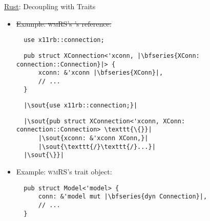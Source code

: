 \begin{frame}[fragile]{\underline{Rust}: Decoupling with Traits \hfill {\footnotesize \currentname}}


    \begin{itemize}

        \item \sout<2>{Example: \textsc{wmRS}'s 's  reference:}\\[3pt]
\begin{overprint}
\begin{verbatim}
  use x11rb::connection;
\end{verbatim}
\begin{verbatim}
  pub struct XConnection<'xconn, |\bfseries{XConn: connection::Connection}|> {
      xconn: &'xconn |\bfseries{XConn}|,
      // ...
  }
\end{verbatim}
\begin{verbatim}
  |\sout{use x11rb::connection;}|
\end{verbatim}
\begin{verbatim}
  |\sout{pub struct XConnection<'xconn, XConn: connection::Connection> \texttt{\{}}|
      |\sout{xconn: &'xconn XConn,}|
      |\sout{\texttt{/}\texttt{/}...}|
  |\sout{\}}|
\end{verbatim}
\end{overprint}

        \item Example: \textsc{wmRS}'s  trait object:\\[3pt]
\begin{verbatim}
  pub struct Model<'model> {
      conn: &'model mut |\bfseries{dyn Connection}|,
      // ...
  }
\end{verbatim}

    \end{itemize}

    \vfill

\end{frame}

